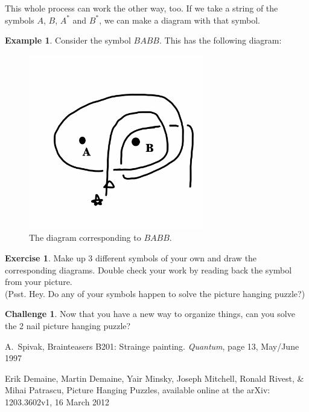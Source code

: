 \documentclass[12pt,letterpaper]{article}
\theoremstyle{definition}
\newtheorem{example}{Example}
\newtheorem{exercise}[question]{Exercise}
\newtheorem*{challenge}{Challenge}
\begin{document}
This whole process can work the other way, too.
If we take a string of the symbols $A$, $B$, $A^*$ and $B^*$, we can make a diagram with that symbol.
\begin{example} 
Consider the symbol $BABB$.
This has the following diagram:
\begin{figure}[h]
    \centering
    \includegraphics[height=3in]{rgp01pics/code2diagr.png}
    \caption{The diagram corresponding to $BABB$.}
\end{figure}
\end{example}

\begin{exercise} Make up 3 different symbols of your own and draw the corresponding diagrams.
Double check your work by reading back the symbol from your picture.\\
(Psst. Hey. Do any of your symbols happen to solve the picture hanging puzzle?)
\end{exercise}

\begin{challenge}
Now that you have a new way to organize things, can you solve the 2 nail picture hanging puzzle?
\end{challenge}

\begin{thebibliography}{9}

    A.~Spivak,
    Brainteasers B201: Strainge painting.
    \emph{Quantum}, page 13,
    May/June 1997

    Erik Demaine, Martin Demaine, Yair Minsky, Joseph Mitchell, Ronald Rivest, \& Mihai Patrascu,
    Picture Hanging Puzzles,
    available online at the arXiv: 1203.3602v1,
    16 March 2012
 
 \end{thebibliography}
\end{document}
